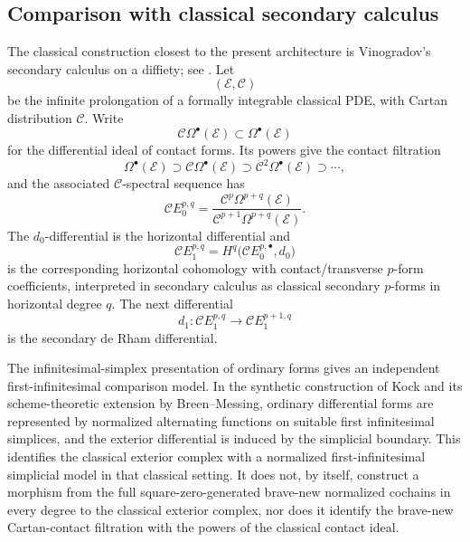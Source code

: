 \subsection{Comparison with classical secondary calculus}
\label{subsec:var-classical-secondary-special-case}

The classical construction closest to the present architecture is Vinogradov's secondary calculus on a diffiety; see \cite{PuglieseSparanoVitagliano2023,Vitolo2000}.  Let
\[
    (\mathscr E,\mathscr C)
\]
be the infinite prolongation of a formally integrable classical PDE, with Cartan distribution \(\mathscr C\).  Write
\[
    \mathscr C\Omega^\bullet(\mathscr E)
    \subset
    \Omega^\bullet(\mathscr E)
\]
for the differential ideal of contact forms.  Its powers give the contact filtration
\[
    \Omega^\bullet(\mathscr E)
    \supset
    \mathscr C\Omega^\bullet(\mathscr E)
    \supset
    \mathscr C^2\Omega^\bullet(\mathscr E)
    \supset\cdots,
\]
and the associated \(\mathscr C\)-spectral sequence has
\[
    \mathscr C E_0^{p,q}
    =
    \frac{
      \mathscr C^p\Omega^{p+q}(\mathscr E)
    }{
      \mathscr C^{p+1}\Omega^{p+q}(\mathscr E)
    }.
\]
The \(d_0\)-differential is the horizontal differential and
\[
    \mathscr C E_1^{p,q}
    =
    H^q
    \bigl(
      \mathscr C E_0^{p,\bullet},
      d_0
    \bigr)
\]
is the corresponding horizontal cohomology with contact/transverse \(p\)-form coefficients, interpreted in secondary calculus as classical secondary \(p\)-forms in horizontal degree \(q\).  The next differential
\[
    d_1:
    \mathscr C E_1^{p,q}
    \longrightarrow
    \mathscr C E_1^{p+1,q}
\]
is the secondary de Rham differential.

The infinitesimal-simplex presentation of ordinary forms gives an independent first-infinitesimal comparison model.  In the synthetic construction of Kock and its scheme-theoretic extension by Breen--Messing, ordinary differential forms are represented by normalized alternating functions on suitable first infinitesimal simplices, and the exterior differential is induced by the simplicial boundary.  This identifies the classical exterior complex with a normalized first-infinitesimal simplicial model in that classical setting.  It does not, by itself, construct a morphism from the full square-zero-generated brave-new normalized cochains in every degree to the classical exterior complex, nor does it identify the brave-new Cartan-contact filtration with the powers of the classical contact ideal.

